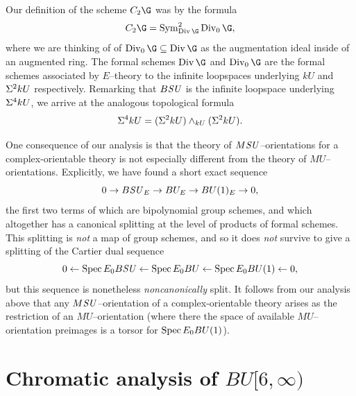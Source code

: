 \begin{remark}
Our definition of the scheme \(C_2 \G\) was by the formula \[C_2 \G = \Sym^2_{\Div \G} \Div_0 \G,\] where we are thinking of of \(\Div_0 \G \subseteq \Div \G\) as the augmentation ideal inside of an augmented ring.
The formal schemes \(\Div \G\) and \(\Div_0 \G\) are the formal schemes associated by \(E\)--theory to the infinite loopspaces underlying \(kU\) and \(\Sigma^2 kU\) respectively.
Remarking that \(B\mathit{SU}\) is the infinite loopspace underlying \(\Sigma^4 kU\), we arrive at the analogous topological formula \[\Sigma^4 kU = (\Sigma^2 kU) \wedge_{kU} (\Sigma^2 kU).\]
\end{remark}

\begin{remark}
One consequence of our analysis is that the theory of \(M\mathit{SU}\)--orientations for a complex-orientable theory is not especially different from the theory of \(MU\)--orientations.
Explicitly, we have found a short exact sequence \[0 \to B\mathit{SU}_E \to BU_E \to BU(1)_E \to 0,\] the first two terms of which are bipolynomial group schemes, and which altogether has a canonical splitting at the level of products of formal schemes.
This splitting is \emph{not} a map of group schemes, and so it does \emph{not} survive to give a splitting of the Cartier dual sequence \[0 \leftarrow \operatorname{Spec} E_0 B\mathit{SU} \leftarrow \operatorname{Spec} E_0 BU \leftarrow \operatorname{Spec} E_0 BU(1) \leftarrow 0,\] but this sequence is nonetheless \emph{noncanonically} split.
It follows from our analysis above that any \(M\mathit{SU}\)--orientation of a complex-orientable theory arises as the restriction of an \(MU\)--orientation (where there the space of available \(MU\)--orientation preimages is a torsor for \(\operatorname{Spec} E_0 BU(1)\)).
\end{remark}












\section{Chromatic analysis of \texorpdfstring{\(BU[6, \infty)\)}{BU[6, oo)}}\label{ChromaticKUCoopnsSection}

